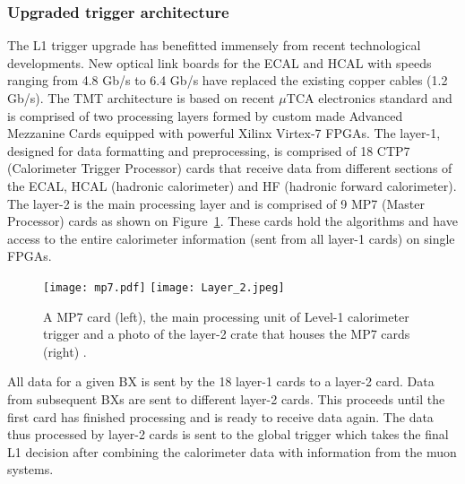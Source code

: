 \documentclass[a4paper,11pt]{article}
\begin{document}
\subsubsection{Upgraded trigger architecture}
\label{subsubsec:hardware}
The L1 trigger upgrade has benefitted immensely from recent technological developments. New optical link boards for the ECAL and HCAL with speeds ranging from 4.8 Gb/s to 6.4 Gb/s have replaced the existing copper cables (1.2 Gb/s). The TMT architecture is based on recent $\mu$TCA electronics standard and is comprised of two processing layers formed by custom made Advanced Mezzanine Cards equipped with powerful Xilinx Virtex-7 FPGAs. The layer-1, designed for data formatting and preprocessing, is comprised of 18 CTP7 (Calorimeter Trigger Processor) cards that receive data from different sections of the ECAL, HCAL  (hadronic calorimeter) and HF (hadronic forward calorimeter). The layer-2 is the main processing layer and is comprised of 9 MP7 (Master Processor) cards as shown on Figure~\ref{fig:b}. These cards hold the algorithms and have access to the entire calorimeter information (sent from all layer-1 cards) on single FPGAs. 
\begin{figure}[htbp]
\centering %
\texttt{[image: mp7.pdf]}
\qquad
\texttt{[image: Layer\_2.jpeg]}
\caption{\label{fig:b}A  MP7 card (left), the main processing unit of Level-1 calorimeter trigger and a photo of the layer-2 crate that houses the MP7 cards (right) .}
\end{figure}

All data for a given BX is sent by the 18 layer-1 cards to a layer-2 card. Data from subsequent BXs are sent to different layer-2 cards. This proceeds until the first card has finished processing and is ready to receive data again. The data thus processed by layer-2 cards is sent  to the global trigger which takes the final L1 decision after combining the calorimeter data with information from the muon systems. 
\end{document}

